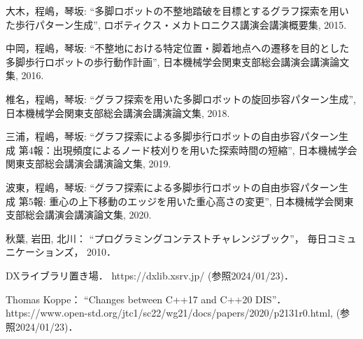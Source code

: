 \begin{thebibliography}{99}
    大木，程嶋，琴坂: 
    ``多脚ロボットの不整地踏破を目標とするグラフ探索を用いた歩行パターン生成'', 
    ロボティクス・メカトロニクス講演会講演概要集,
    2015.   

    中岡，程嶋，琴坂: 
    ``不整地における特定位置・脚着地点への遷移を目的とした多脚歩行ロボットの歩行動作計画'',
    日本機械学会関東支部総会講演会講演論文集,
    2016.

    椎名，程嶋，琴坂: 
    ``グラフ探索を用いた多脚ロボットの旋回歩容パターン生成'',
    日本機械学会関東支部総会講演会講演論文集,
    2018.

    三浦，程嶋，琴坂: 
    ``グラフ探索による多脚歩行ロボットの自由歩容パターン生成 第4報：出現頻度によるノード枝刈りを用いた探索時間の短縮'',
    日本機械学会関東支部総会講演会講演論文集,
    2019.

    波東，程嶋，琴坂: 
    ``グラフ探索による多脚歩行ロボットの自由歩容パターン生成 第5報: 重心の上下移動のエッジを用いた重心高さの変更'',
    日本機械学会関東支部総会講演会講演論文集,
    2020.

    秋葉, 岩田, 北川：
    ``プログラミングコンテストチャレンジブック''，
    毎日コミュニケーションズ，
    2010．
    
    DXライブラリ置き場．
    https://dxlib.xsrv.jp/ (参照2024/01/23)．

    Thomas Koppe：
    ``Changes between C++17 and C++20 DIS''．
    https://www.open-std.org/jtc1/sc22/wg21/docs/papers/2020/p2131r0.html, 
    (参照2024/01/23)．


\end{thebibliography}
\endinput